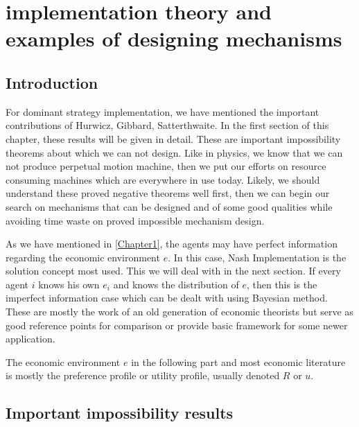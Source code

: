 
\chapter{implementation theory and examples of designing mechanisms  }  %

\label{Chapter2} %




\section{Introduction}
For dominant strategy implementation, we have mentioned the important
contributions of Hurwicz, Gibbard, Satterthwaite. In the first section
of this chapter, these results will be given in detail. These are
important impossibility theorems about which we can not design. Like
in physics, we know that we can not produce perpetual motion machine,
then we put our efforts on resource consuming machines which are
everywhere in use today. Likely, we should understand these proved
negative theorems well first, then we can begin our search on
mechanisms that can be designed and of some good qualities while
avoiding time waste on proved impossible mechanism design.


As we have mentioned in \ref{Chapter1}, the agents may have perfect
information regarding the economic environment $e$. In this case, Nash
Implementation is the solution concept most used. This we will deal
with in the next section.  If every agent $i$ knows his own $e_i$ and
knows the distribution of $e$, then this is the imperfect information
case which can be dealt with using Bayesian method.  These are mostly the
work of an old generation of  economic theorists but serve as good
reference points for comparison or provide basic
framework for some newer application. 

The economic environment $e$ in the following part and most economic literature is mostly the preference profile or utility profile, usually denoted $R$ or $u$.
\section{Important impossibility results}


